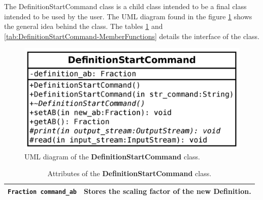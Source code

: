 \documentclass[11pt,twoside,openany,x11names,svgnames]{memoir}
\begin{document}
The DefinitionStartCommand class is a child class intended to be a final class intended to be used by the user. The UML diagram found in the figure \ref{fig:class-definitionstart-command} shows the general idea behind the class. The tables \ref{tab:DefinitionStartCommand-Attributes} and \ref{tab:DefinitionStartCommand-MemberFunctions} details the interface of the class.

\begin{figure}
	\centering
	\includegraphics[scale=0.2, clip=true, trim= 0pt 0pt 0pt 0pt]{images/chapter03-image25}
	\caption{UML diagram of the \textbf{DefinitionStartCommand} class.}
	\label{fig:class-definitionstart-command}
\end{figure}

\begin{table}[h]\footnotesize
\centering
\begin{tabular}{| >{\bfseries}p{6.5cm} | p{9cm} |}
	\hline
	
	\texttt{Fraction command\_ab} & Stores the scaling factor of the new Definition. \\
	
	\hline
\end{tabular}
\caption{Attributes of the \textbf{DefinitionStartCommand} class.}
\label{tab:DefinitionStartCommand-Attributes}
\end{table}
\end{document}
